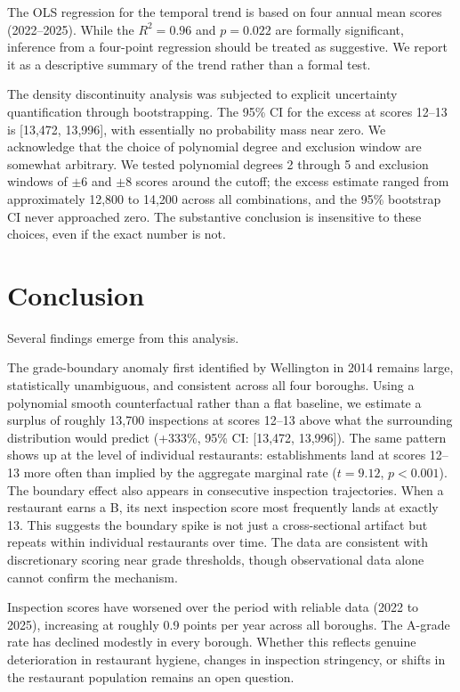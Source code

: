\documentclass[11pt, twocolumn]{article}
\begin{document}
The OLS regression for the temporal trend is based on four annual
mean scores (2022--2025). While the $R^2 = 0.96$ and $p = 0.022$
are formally significant, inference from a four-point regression
should be treated as suggestive. We report it as a descriptive summary
of the trend rather than a formal test.

The density discontinuity analysis was subjected to explicit uncertainty
quantification through bootstrapping. The 95\% CI for the excess at
scores 12--13 is [13,472, 13,996], with essentially no probability
mass near zero. We acknowledge that the choice of polynomial degree and
exclusion window are somewhat arbitrary. We tested polynomial degrees 2
through 5 and exclusion windows of $\pm 6$ and $\pm 8$ scores around
the cutoff; the excess estimate ranged from approximately 12,800 to 14,200
across all combinations, and the 95\% bootstrap CI never approached zero.
The substantive conclusion is insensitive to these choices, even if the
exact number is not.

\section{Conclusion}

Several findings emerge from this analysis.

The grade-boundary anomaly first identified by Wellington in 2014 remains
large, statistically unambiguous, and consistent across all four boroughs.
Using a polynomial smooth counterfactual rather than a flat baseline, we
estimate a surplus of roughly 13,700 inspections at scores 12--13
above what the surrounding distribution would predict (+333\%, 95\% CI:
[13,472, 13,996]). The same pattern shows up at the level of individual
restaurants: establishments land at scores 12--13 more often than
implied by the aggregate marginal rate ($t = 9.12$, $p < 0.001$). The
boundary effect also appears in consecutive inspection trajectories.
When a restaurant earns a B, its next inspection score most frequently
lands at exactly 13. This suggests the boundary spike is not just a
cross-sectional artifact but repeats within individual restaurants
over time. The data are consistent with discretionary scoring near grade
thresholds, though observational data alone cannot confirm the mechanism.

Inspection scores have worsened over the period with reliable data (2022
to 2025), increasing at roughly 0.9 points per year across all boroughs.
The A-grade rate has declined modestly in every borough. Whether this
reflects genuine deterioration in restaurant hygiene, changes in
inspection stringency, or shifts in the restaurant population remains an
open question.
\end{document}
